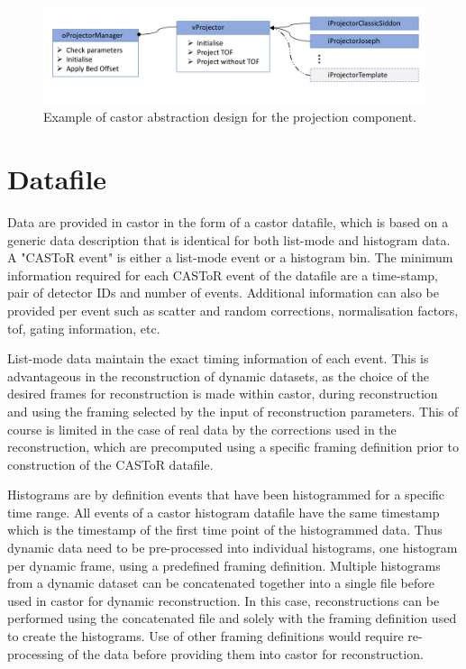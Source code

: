 \begin{figure} [ht!]
\centering
\includegraphics[scale=0.50,angle=0]{2_Theory_Methods/figures/oProjectorManager.pdf}
\caption{Example of \gls{castor} abstraction design for the projection component.} 
\label{fig_2_4:oProjectorManager}
\end{figure}


\section{Datafile}
Data are provided in \gls{castor} in the form of a \gls{castor} datafile, which is based on a generic data description that is identical for both list-mode and histogram data. A "CASToR event" is either a list-mode event or a histogram bin.
The minimum information required for each CASToR event of the datafile are a time-stamp, pair of detector IDs and number of events. Additional information can also be provided per event such as scatter and random corrections, normalisation factors, \gls{tof}, gating information, etc. 

List-mode data maintain the exact timing information of each event. This is advantageous in the reconstruction of dynamic datasets, as the choice of the desired frames for reconstruction is made within \gls{castor}, during reconstruction and using the framing selected by the input of reconstruction parameters. This of course is limited in the case of real data by the corrections used in the reconstruction, which are precomputed using a specific framing definition prior to construction of the CASToR datafile.

Histograms are by definition events that have been histogrammed for a specific time range. All events of a \gls{castor} histogram datafile have the same timestamp which is the timestamp of the first time point of the histogrammed data. Thus dynamic data need to be pre-processed into individual histograms, one histogram per dynamic frame, using a predefined framing definition.
Multiple histograms from a dynamic dataset can be concatenated together into a single file before used in \gls{castor} for dynamic reconstruction. In this case, reconstructions can be performed using the concatenated file and solely with the framing definition used to create the histograms. 
Use of other framing definitions would require re-processing of the data before providing them into \gls{castor} for reconstruction.

